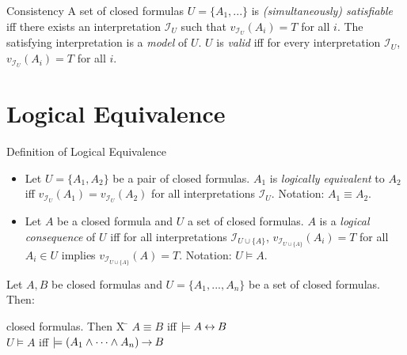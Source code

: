 \documentclass[style=sailor,size=12pt,mode=present]{powerdot}
\theoremstyle{definition}
\newenvironment{defn}[1]
  {\renewcommand\theinnerdefn{#1}\innerdefn}
  {\endinnerdefn}
\newenvironment{thm}[1]
  {\renewcommand\theinnerthm{#1}\innerthm}
  {\endinnerthm}
\begin{document}
\begin{wideslide}[bm=,toc=]{Consistency}
\begin{defn}{7.27}[Ben Ari]
A set of closed formulas $U = \{A_1,...\}$ is \emph{(simultaneously)
  satisfiable} iff there exists an interpretation $\mathcal{I}_U$ such that
  $v_{\mathcal{I}_U}(A_i) = T$ for all $i$. The satisfying interpretation
  is a \emph{model} of $U$. $U$ is \emph{valid} iff for every interpretation
  $\mathcal{I}_U$, $v_{\mathcal{I}_U}(A_i) = T$ for all $i$.
\end{defn}

\end{wideslide}

\section[slide=false]{Logical Equivalence}

\begin{wideslide}[bm=,toc=]{Definition of Logical Equivalence}
\begin{defn}{7.28}[Ben Ari]
\end{defn}
\vspace{-2ex}
\begin{itemize}
\item Let $U = \{A_1,A_2\}$ be a pair of closed formulas. $A_1$ is
\emph{logically equivalent} to $A_2$ iff $v_{{\mathcal{I}_U}}(A_1) =
v_{{\mathcal{I}_U}}(A_2)$ for all interpretations $\mathcal{I}_U$.
Notation: $A_1 \equiv A_2$.
\item Let $A$ be a closed formula and $U$ a set of closed formulas.
$A$ is a \emph{logical consequence} of $U$ iff for all interpretations
$\mathcal{I}_{U \cup \{A\}}$, $v_{\mathcal{I}_{U \cup \{A\}}}(A_i) = T$ for
all $A_i \in U$ implies $v_{\mathcal{I}_{U \cup \{A\}}}(A) = T$. Notation: $U \models A$.
\end{itemize}
\begin{thm}{7.29}
Let $A,B$ be closed formulas and $U = \{A_1,...,A_n\}$ be a set of
closed formulas. Then:
\end{thm}
\vspace{-5ex}
\begin{tabbing}
closed formulas. Then X \= \kill
\> $A \equiv B$ iff $\models A \mathbin{\leftrightarrow} B$\\
\> $U \models A$ iff $\models (A_1 \land \cdots \land A_n) \mathbin{\rightarrow} B$
\end{tabbing}

\end{wideslide}
\end{document}

